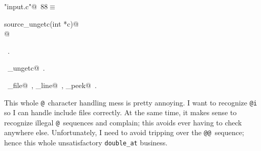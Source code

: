 \documentclass[a4paper]{report}
\begin{document}
\begin{flushleft} \small
\begin{minipage}{\linewidth}\label{scrap182}\raggedright\small
{} \verb@"input.c"@\nobreak\ {\footnotesize {88}}$\equiv$
\vspace{-1ex}
\begin{list}{}{} \item
\mbox{}\verb@void source_ungetc(int *c)@\\
\mbox{}@\\
\mbox{}\verb@@{\NWsep}
\end{list}
\vspace{-1.5ex}
\footnotesize
\begin{list}{}{\setlength{\itemsep}{-\parsep}\setlength{\itemindent}{-\leftmargin}}
\item \NWtxtFileDefBy\ .
\item \NWtxtIdentsDefed\nobreak\  \verb@source_ungetc@\nobreak\ .\item \NWtxtIdentsUsed\nobreak\  \verb@source_file@\nobreak\ , \verb@source_line@\nobreak\ , \verb@source_peek@\nobreak\ .
\item{}
\end{list}
\end{minipage}\vspace{4ex}
\end{flushleft}
This whole \verb|@|~character handling mess is pretty annoying.
I want to recognize \verb|@i| so I can handle include files correctly.
At the same time, it makes sense to recognize illegal \verb|@|~sequences
and complain; this avoids ever having to check anywhere else.
Unfortunately, I need to avoid tripping over the \verb|@@|~sequence;
hence this whole unsatisfactory \verb|double_at| business.
\end{document}
